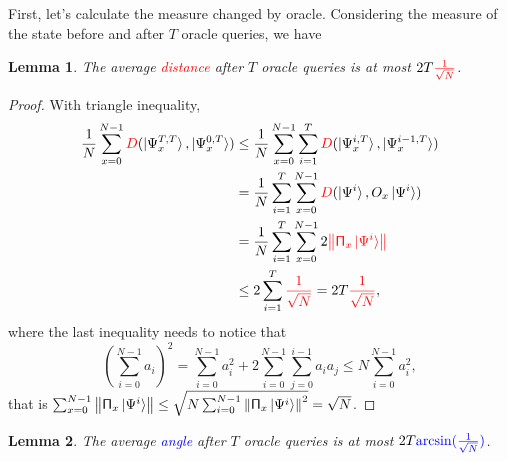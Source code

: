 \documentclass[a4paper,10pt]{article}
\newtheorem{lemma}{Lemma}[subsection]
\numberwithin{equation}{subsection}
\begin{document}
First, let's calculate the measure changed by oracle. Considering the measure of the state before and after $T$ oracle queries, we have
\begin{lemma}
    The average \textcolor{red}{distance} after $T$ oracle queries is at most $2T\textcolor{red}{\frac{1}{\sqrt{N}}}$.
\end{lemma}
\begin{proof}
    With triangle inequality,
    \begin{equation}
        \begin{split}
            \frac{1}{N}\sum_{x=0}^{N-1}\textcolor{red}{D}(\ket{\Psi_{x}^{T,T}},\ket{\Psi_{x}^{0,T}})
             & \leq \frac{1}{N}\sum_{x=0}^{N-1}\sum_{i=1}^{T}\textcolor{red}{D}(\ket{\Psi_{x}^{i,T}},\ket{\Psi_{x}^{i-1,T}}) \\
             & = \frac{1}{N}\sum_{i=1}^{T}\sum_{x=0}^{N-1}\textcolor{red}{D}(\ket{\Psi^{i}},O_{x}\ket{\Psi^{i}})             \\
             & = \frac{1}{N}\sum_{i=1}^{T}\sum_{x=0}^{N-1}2\textcolor{red}{\left\| \mathsf{\Pi}_{x}\ket{\Psi^{i}}\right\|}   \\
             & \leq 2\sum_{i=1}^{T}\textcolor{red}{\frac{1}{\sqrt{N}}} = 2T\textcolor{red}{\frac{1}{\sqrt{N}}},
        \end{split}
    \end{equation}
    where the last inequality needs to notice that
    \begin{equation}\label{Cauchy-Schwarz}
        \left(\sum_{i=0}^{N-1}a_{i}\right)^{2}=\sum_{i=0}^{N-1}a_{i}^{2}+2\sum_{i=0}^{N-1}\sum_{j=0}^{i-1}a_{i}a_{j}\leq N\sum_{i=0}^{N-1}a_{i}^{2},
    \end{equation}
    that is $\sum_{x=0}^{N-1}\left\|\mathsf{\Pi}_{x}\ket{\Psi^{i}}\right\|\leq \sqrt{N\sum_{i=0}^{N-1}\left\|\mathsf{\Pi}_{x}\ket{\Psi^{i}}\right\|^{2}}=\sqrt{N}$.
\end{proof}
\begin{lemma}
    The average \textcolor{blue}{angle} after $T$ oracle queries is at most $2T\textcolor{blue}{\arcsin(\frac{1}{\sqrt{N}})}$.
\end{lemma}
\end{document}

